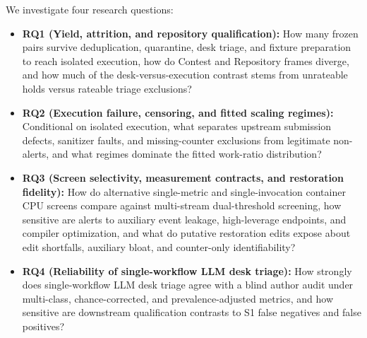 \documentclass[11pt]{article}
\begin{document}
We investigate four research questions:
\begin{itemize}
\item \textbf{RQ1 (Yield, attrition, and repository qualification):} How many frozen pairs survive deduplication, quarantine, desk triage, and fixture preparation to reach isolated execution, how do Contest and Repository frames diverge, and how much of the desk-versus-execution contrast stems from unrateable holds versus rateable triage exclusions?
\item \textbf{RQ2 (Execution failure, censoring, and fitted scaling regimes):} Conditional on isolated execution, what separates upstream submission defects, sanitizer faults, and missing-counter exclusions from legitimate non-alerts, and what regimes dominate the fitted work-ratio distribution?
\item \textbf{RQ3 (Screen selectivity, measurement contracts, and restoration fidelity):} How do alternative single-metric and single-invocation container CPU screens compare against multi-stream dual-threshold screening, how sensitive are alerts to auxiliary event leakage, high-leverage endpoints, and compiler optimization, and what do putative restoration edits expose about edit shortfalls, auxiliary bloat, and counter-only identifiability?
\item \textbf{RQ4 (Reliability of single-workflow LLM desk triage):} How strongly does single-workflow LLM desk triage agree with a blind author audit under multi-class, chance-corrected, and prevalence-adjusted metrics, and how sensitive are downstream qualification contrasts to S1 false negatives and false positives?
\end{itemize}
\end{document}
